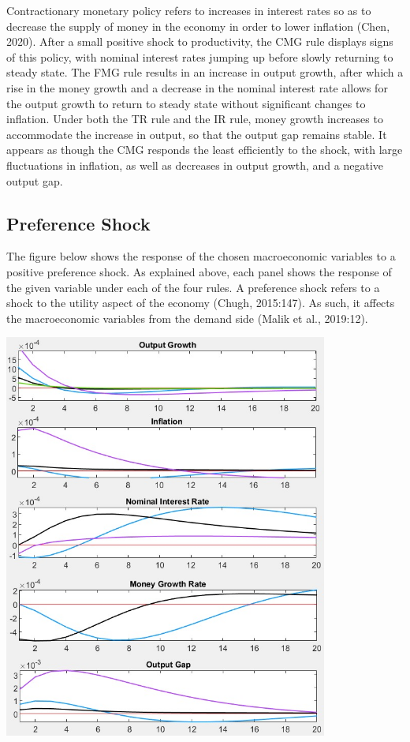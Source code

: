 \documentclass[11pt,preprint, authoryear]{elsarticle}
\let\origfigure\figure
\let\endorigfigure\endfigure
\renewenvironment{figure}[1][2] {
    \expandafter\origfigure\expandafter[H]
} {
    \endorigfigure
}
\numberwithin{equation}{section}
\numberwithin{figure}{section}
\numberwithin{table}{section}
\begin{document}
Contractionary monetary policy refers to increases in interest rates so
as to decrease the supply of money in the economy in order to lower
inflation (Chen, 2020). After a small positive shock to productivity,
the CMG rule displays signs of this policy, with nominal interest rates
jumping up before slowly returning to steady state. The FMG rule results
in an increase in output growth, after which a rise in the money growth
and a decrease in the nominal interest rate allows for the output growth
to return to steady state without significant changes to inflation.
Under both the TR rule and the IR rule, money growth increases to
accommodate the increase in output, so that the output gap remains
stable. It appears as though the CMG responds the least efficiently to
the shock, with large fluctuations in inflation, as well as decreases in
output growth, and a negative output gap.

\hypertarget{preference-shock}{%
\subsection{Preference Shock}\label{preference-shock}}

The figure below shows the response of the chosen macroeconomic
variables to a positive preference shock. As explained above, each panel
shows the response of the given variable under each of the four rules. A
preference shock refers to a shock to the utility aspect of the economy
(Chugh, 2015:147). As such, it affects the macroeconomic variables from
the demand side (Malik et al., 2019:12).

\begin{figure}
\centering
\includegraphics[width=0.8\textwidth,height=0.6\textheight]{./figures/preference-shock.jpeg}
\caption{Plots of Impulse Response Functions for a Preference Shock}
\end{figure}
\end{document}
